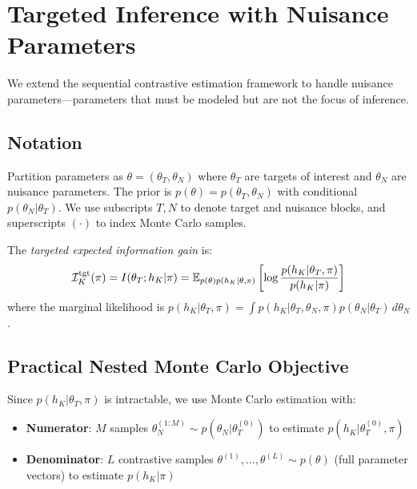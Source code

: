 
\section{Targeted Inference with Nuisance Parameters}
\label{sec:nuisance}

We extend the sequential contrastive estimation framework to handle nuisance parameters—parameters that must be modeled but are not the focus of inference.

\subsection{Notation}

Partition parameters as $\theta = (\theta_T, \theta_N)$ where $\theta_T$ are targets of interest and $\theta_N$ are nuisance parameters. The prior is $p(\theta) = p(\theta_T, \theta_N)$ with conditional $p(\theta_N|\theta_T)$.
We use subscripts $T,N$ to denote target and nuisance blocks, and superscripts $(\cdot)$ to index Monte Carlo samples.

The \emph{targeted expected information gain} is:
\begin{equation}
\mathcal{I}_K^{\text{tgt}}(\pi) = I(\theta_T; h_K | \pi) = \operatorname{\mathbb{E}}_{p(\theta)p(h_K|\theta,\pi)}\left[\log \frac{p(h_K|\theta_T,\pi)}{p(h_K|\pi)}\right]
\end{equation}
where the marginal likelihood is $p(h_K|\theta_T,\pi) = \int p(h_K|\theta_T, \theta_N, \pi) p(\theta_N|\theta_T) \, d\theta_N$.

\subsection{Practical Nested Monte Carlo Objective}

Since $p(h_K|\theta_T,\pi)$ is intractable, we use Monte Carlo estimation with:
\begin{itemize}
    \item \textbf{Numerator}: $M$ samples $\theta_N^{(1:M)} \sim p(\theta_N|\theta_T^{(0)})$ to estimate $p(h_K|\theta_T^{(0)},\pi)$
    \item \textbf{Denominator}: $L$ contrastive samples $\theta^{(1)},\ldots,\theta^{(L)} \sim p(\theta)$ (full parameter vectors) to estimate $p(h_K|\pi)$
\end{itemize}

